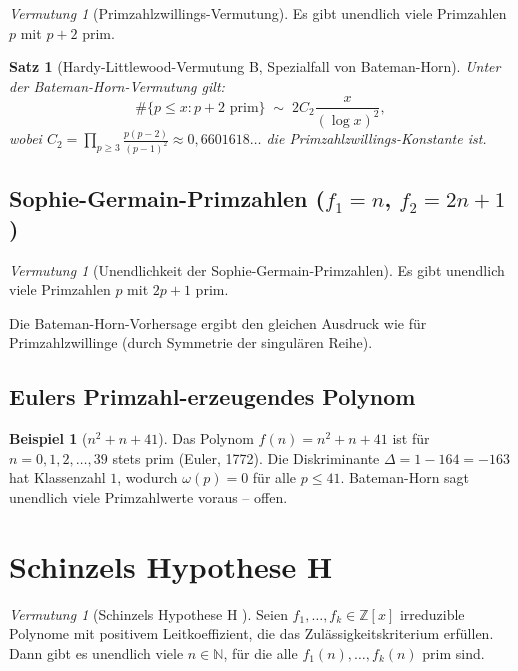 \documentclass[12pt,a4paper]{amsart}
\newtheorem{satz}[theorem]{Satz}
\theoremstyle{definition}
\newtheorem{example}[theorem]{Beispiel}
\theoremstyle{remark}
\newtheorem{vermutung}[theorem]{Vermutung}
\newcommand{\Z}{\mathbb{Z}}
\newcommand{\N}{\mathbb{N}}
\begin{document}
\begin{vermutung}[Primzahlzwillings-Vermutung]\label{verm:zwillinge}
  Es gibt unendlich viele Primzahlen $p$ mit $p+2$ prim.
\end{vermutung}

\begin{satz}[Hardy-Littlewood-Vermutung B, Spezialfall von Bateman-Horn]
  Unter der Bateman-Horn-Vermutung gilt:
  \[
    \#\{p \leq x : p+2 \text{ prim}\} \;\sim\;
    2C_2 \frac{x}{(\log x)^2},
  \]
  wobei $C_2 = \prod_{p \geq 3} \frac{p(p-2)}{(p-1)^2} \approx 0{,}6601618\ldots$
  die \emph{Primzahlzwillings-Konstante} ist.
\end{satz}

\subsection{Sophie-Germain-Primzahlen ($f_1 = n$, $f_2 = 2n+1$)}

\begin{vermutung}[Unendlichkeit der Sophie-Germain-Primzahlen]\label{verm:sg}
  Es gibt unendlich viele Primzahlen $p$ mit $2p+1$ prim.
\end{vermutung}

Die Bateman-Horn-Vorhersage ergibt den gleichen Ausdruck wie für Primzahlzwillinge
(durch Symmetrie der singulären Reihe).

\subsection{Eulers Primzahl-erzeugendes Polynom}

\begin{example}[$n^2+n+41$]
  Das Polynom $f(n) = n^2+n+41$ ist für $n = 0, 1, 2, \ldots, 39$ stets prim
  (Euler, 1772). Die Diskriminante $\Delta = 1-164 = -163$ hat Klassenzahl $1$,
  wodurch $\omega(p) = 0$ für alle $p \leq 41$. Bateman-Horn sagt unendlich viele
  Primzahlwerte voraus -- offen.
\end{example}

\section{Schinzels Hypothese H}\label{sec:schinzel}

\begin{vermutung}[Schinzels Hypothese H \cite{Schinzel1958}]
  \label{verm:schinzel}
  Seien $f_1, \ldots, f_k \in \Z[x]$ irreduzible Polynome mit positivem Leitkoeffizient,
  die das Zulässigkeitskriterium erfüllen.
  Dann gibt es unendlich viele $n \in \N$, für die alle $f_1(n), \ldots, f_k(n)$ prim sind.
\end{vermutung}
\end{document}
